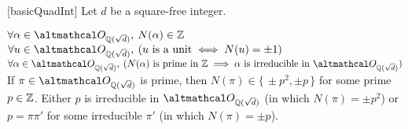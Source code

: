 \documentclass[../modern_algebra_2.tex]{subfiles}
\begin{document}
\begin{Theorem}{}[basicQuadInt]
    Let \(d\) be a square-free integer.
    \begin{enumerate}[label=(\roman*), ref=\protect{\Cref{th:basicQuadInt} (\roman*)}, listparindent=\parindent]
        \ii\label{itm:basicQuadInt.i}
        \(\fall \alpha \in \rqi{\sqrt{d}},\: N(\alpha) \in \ZZ\)
        \ii\label{itm:basicQuadInt.ii}
        \(\fall u \in \rqi{\sqrt{d}},\: (u~\text{is a unit} \iff N(u) = \pm 1)\)
        \ii\label{itm:basicQuadInt.iii}
        \(\fall \alpha \in \rqi{\sqrt{d}},\:
        (N(\alpha)~\text{is prime in}~\ZZ \implies \alpha~\text{is irreducible in}~\rqi{\sqrt{d}})\)
        \ii\label{itm:basicQuadInt.iv}
        If \(\pi \in \rqi{\sqrt{d}}\) is prime,
        then \(N(\pi) \in \{\,\pm p^2, \pm p\,\}\) for some prime \(p \in \ZZ\).
        Either \(p\) is irreducible in \(\rqi{\sqrt{d}}\) (in which \(N(\pi) = \pm p^2\))
        or \(p = \pi \pi'\) for some irreducible \(\pi'\) (in which \(N(\pi) = \pm p\)).
    \end{enumerate}
\end{Theorem}
\end{document}
